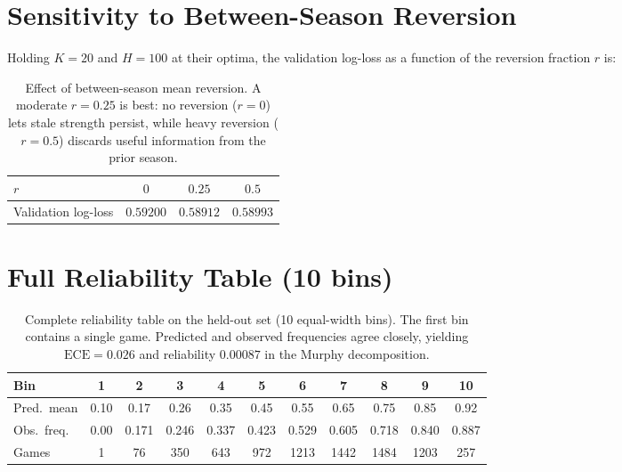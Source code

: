 \documentclass[11pt]{article}
\begin{document}
\section{Sensitivity to Between-Season Reversion}
Holding $K=20$ and $H=100$ at their optima, the validation log-loss as a function
of the reversion fraction $r$ is:
\begin{table}[h]
\centering
\begin{tabular}{lccc}
\toprule
$r$ & $0$ & $0.25$ & $0.5$ \\
\midrule
Validation log-loss & $0.59200$ & $\mathbf{0.58912}$ & $0.58993$ \\
\bottomrule
\end{tabular}
\caption{Effect of between-season mean reversion. A moderate $r=0.25$ is best:
no reversion ($r=0$) lets stale strength persist, while heavy reversion ($r=0.5$)
discards useful information from the prior season.}
\end{table}

\section{Full Reliability Table (10 bins)}
\begin{table}[h]
\centering
\small
\begin{tabular}{lcccccccccc}
\toprule
Bin & 1 & 2 & 3 & 4 & 5 & 6 & 7 & 8 & 9 & 10 \\
\midrule
Pred.\ mean & 0.10 & 0.17 & 0.26 & 0.35 & 0.45 & 0.55 & 0.65 & 0.75 & 0.85 & 0.92 \\
Obs.\ freq.\ & 0.00 & 0.171 & 0.246 & 0.337 & 0.423 & 0.529 & 0.605 & 0.718 & 0.840 & 0.887 \\
Games & 1 & 76 & 350 & 643 & 972 & 1213 & 1442 & 1484 & 1203 & 257 \\
\bottomrule
\end{tabular}
\caption{Complete reliability table on the held-out set (10 equal-width bins).
The first bin contains a single game. Predicted and observed frequencies agree
closely, yielding $\mathrm{ECE}=0.026$ and reliability $0.00087$ in the Murphy
decomposition.}
\end{table}
\end{document}
